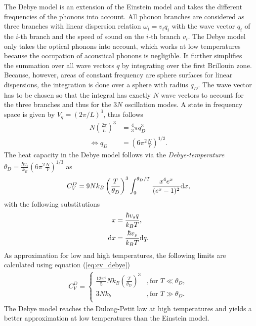 The Debye model is an extension of the Einstein model and takes the different frequencies of the phonons into account.
All phonon branches are considered as three branches with linear dispersion relation $\omega_i = v_i q_i$ with the wave vector $q_i$ of the $i$-th branch and the speed of sound on the $i$-th branch $v_i$.
The Debye model only takes the optical phonons into account, which works at low temperatures because the occupation of acoustical phonons is negligible.
It further simplifies the summation over all wave vectors $q$ by integrating over the first Brillouin zone.
Because, however, areas of constant frequency are sphere surfaces for linear dispersions, the integration is done over a sphere with radius $q_D$.
The wave vector has to be chosen so that the integral has exactly $N$ wave vectors to account for the three branches and thus for the $3N$ oscillation modes.
A state in frequency space is given by $V_q = (2\pi/L)^3$, thus follows
\begin{align}
    N\left(\frac{2\pi}{L}\right)^3 &= \frac 43\pi q_D^3 \\
    \iff q_D &= \left(6\pi^2\frac NV\right)^{1/3}.
    \label{eq:q_D}
\end{align}
The heat capacity in the Debye model follows via the \textit{Debye-temperature} $\theta_D=\frac{\hbar v_s}{k_B}\left(6\pi^2\frac NV\right)^{1/3}$ as
\begin{align}
    C_V^D=9Nk_B\left(\frac{T}{\theta_D}\right)^3\int_0^{\theta_D/T}\frac{x^4e^x}{(e^x-1)^2}\text dx,
    \label{eq:cv_debye}
\end{align}
with the following substitutions
\begin{align}
    \label{eq:substitution_x}
    x &= \frac{\hbar v_s q}{k_BT}, \\
    \text dx &= \frac{\hbar v_s}{k_BT}\text dq.
    \label{eq:substitution_dx}
\end{align}
As approximation for low and high temperatures, the following limits are calculated using equation (\ref{eq:cv_debye})
\begin{align}
    C_V^D=\begin{cases}
        \frac{12\pi^4}{5}Nk_B\left(\frac{T}{\theta_D} \right)^3 &,\text{for }T\ll\theta_D, \\
        3Nk_b &,\text{for }T\gg\theta_D. \\
        \end{cases}
    \label{eq:cv_debye_final}
\end{align}
The Debye model reaches the Dulong-Petit law at high temperatures and yields a better approximation at low temperatures than the Einstein model. \newline
